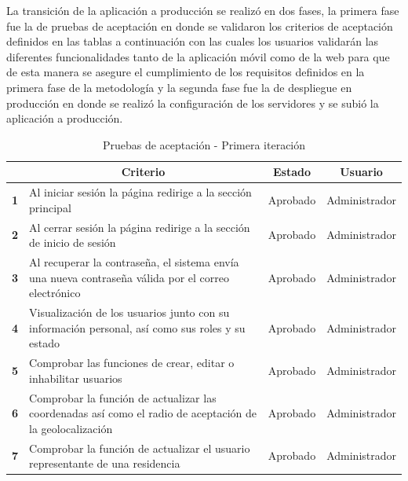 La transición de la aplicación a producción se realizó en dos fases, la primera fase fue la de pruebas de aceptación en donde se validaron los criterios de aceptación definidos en las tablas a continuación con las cuales los usuarios validarán las diferentes funcionalidades tanto de la aplicación móvil como de la web para que de esta manera se asegure el cumplimiento de los requisitos definidos en la primera fase de la metodología y la segunda fase fue la de despliegue en producción en donde se realizó la configuración de los servidores y se subió la aplicación a producción.

\begin{footnotesize}

\begin{spacing}{1}
    \begin{center}
    \renewcommand*{\arraystretch}{1.4}
    \begin{longtable}{ |>{\bfseries}l|p{}|l|l| }
        \caption{Pruebas de aceptación - Primera iteración}\\
        \hline
        \multicolumn{1}{|c|}{ \textbf{N.}} & \multicolumn{1}{c|}{\textbf{Criterio}} & \multicolumn{1}{c|}{ \textbf{Estado}} & \multicolumn{1}{c|}{ \textbf{Usuario}}\\
        \hline
        1 & Al iniciar sesión la página redirige a la sección principal & Aprobado & Administrador\\
        \hline
        2 & Al cerrar sesión la página redirige a la sección de inicio de sesión & Aprobado & Administrador\\
        \hline
        3 & Al recuperar la contraseña, el sistema envía una nueva contraseña válida por el correo electrónico & Aprobado & Administrador\\
        \hline
        4 & Visualización de los usuarios junto con su información personal, así como sus roles y su estado & Aprobado & Administrador\\
        \hline
        5 & Comprobar las funciones de crear, editar o inhabilitar usuarios & Aprobado & Administrador\\
        \hline
        6 & Comprobar la función de actualizar las coordenadas así como el radio de aceptación de la geolocalización & Aprobado & Administrador\\
        \hline
        7 & Comprobar la función de actualizar el usuario representante de una residencia & Aprobado & Administrador\\
        \hline
    \end{longtable}\label{tab:pruebas-aceptacion-1}
    \end{center}
\end{spacing}
\end{footnotesize}

